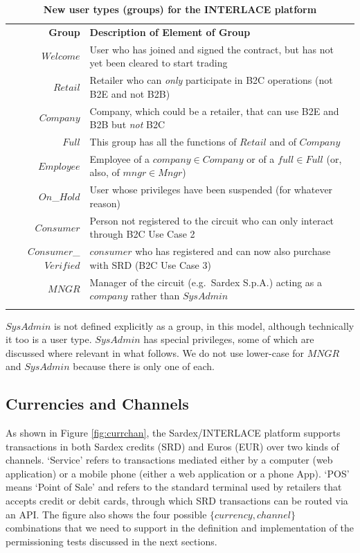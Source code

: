 \setlength{\tabcolsep}{10pt}
\begin{table}[h]
\vspace{-0.3cm}
\begin{centering}
\small
{
\begin{tabular}{ r | l  }
\hline
\textbf{Group}	& \textbf{Description of Element of Group} \\
\Xhline{1.5pt}
$Welcome$ & User who has joined and signed the contract, but has not yet been cleared to start trading \\
\hline
$Retail$ & Retailer who can \emph{only} participate in B2C operations (not B2E and not B2B) \\
\hline
$Company$ & Company, which could be a retailer, that can use B2E and B2B but \emph{not} B2C \\
\hline
$Full$ & This group has all the functions of $Retail$ and of $Company$ \\
\hline
$Employee$ & Employee of a $company\in Company$ or of a $full \in Full$ (or, also, of $mngr \in Mngr$)\\
\hline
$On$\_$Hold$ & User whose privileges have been suspended (for whatever reason) \\
\hline
$Consumer$ & Person not registered to the circuit who can only interact through B2C Use Case 2 \\
\hline
$Consumer$\_$Verified$ & $consumer$ who has registered and can now also purchase with SRD (B2C Use Case 3)  \\
\hline
$MNGR$ & Manager of the circuit (e.g.\ Sardex S.p.A.) acting as a $company$ rather than $SysAdmin$ \\
\Xhline{1.5pt}
\end{tabular}
}
\caption{\small\textbf{New user types (groups) for the INTERLACE platform}}
\label{tab:groups}
\end{centering}
\vspace{-0.7cm}
\end{table}

$SysAdmin$ is not defined explicitly as a group, in this model, although technically it too is a user type. $SysAdmin$ has special privileges, some of which are discussed where relevant in what follows. We do not use lower-case for $MNGR$ and $SysAdmin$ because there is only one of each.

\subsection{Currencies and Channels}
As shown in Figure \ref{fig:currchan}, the Sardex/INTERLACE platform supports transactions in both Sardex credits (SRD) and Euros (EUR) over two kinds of channels. `Service' refers to transactions mediated either by a computer (web application) or a mobile phone (either a web application or a phone App). `POS' means `Point of Sale' and refers to the standard terminal used by retailers that accepts credit or debit cards, through which SRD transactions can be routed via an API. The figure also shows the four possible $\{ currency, channel \}$ combinations that we need to support in the definition and implementation of the permissioning tests discussed in the next sections.

